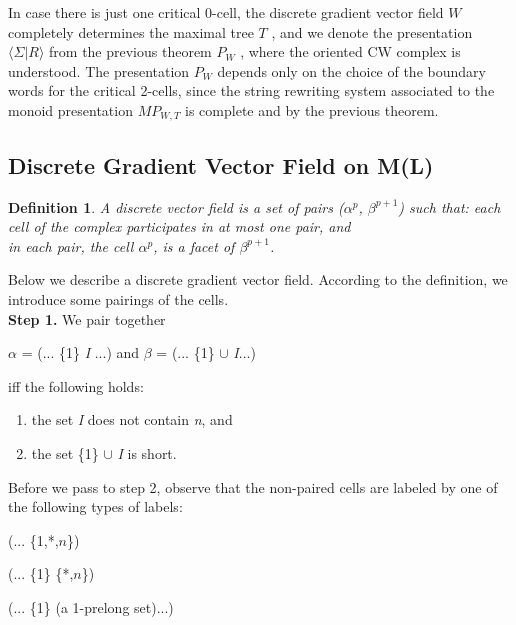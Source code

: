 \documentclass{amsart}
\newtheorem{Definition}[theorem]{Definition}
\newenvironment{definition}{\begin{Definition}\normalfont}{\end{Definition}}
\begin{document}
In case there is just one critical 0-cell, the discrete gradient vector field $W$ completely determines the maximal tree $T$ , and we denote the presentation $\langle \Sigma | R \rangle$ from the previous theorem $P_W$ , where the oriented CW complex is understood. The presentation $P_W$ depends only on the choice of the boundary words for the critical 2-cells, since the string rewriting system associated to the monoid presentation $MP_{W,T}$ is complete and by the previous theorem.


\subsection{Discrete Gradient Vector Field on M(L)}

\begin{definition}\cite{PANZU} A \textit{discrete vector field} is a set of pairs ($\alpha^{p}$, $\beta^{p+1}$)
such that:
each cell of the complex participates in at most one pair, and\\
in each pair, the cell $\alpha^{p}$,  is a facet of $\beta^{p+1}$.
\end{definition}

Below we describe a discrete gradient vector field.
According to the definition, we introduce some pairings of the cells.\\
\textbf{Step 1.} We pair together\\
\begin{center}
{$\alpha$ = (... \{1\} \textit{I} ...) and $\beta$ = (... \{1\} $\cup$ \textit{I}...)}
\end{center}
iff the following holds:\\
\begin{enumerate}
\item the set \textit{I} does not contain \textit{n}, and
\item the set \{1\} $\cup$ \textit{I} is short.
\end{enumerate}

Before we pass to step 2, observe that the non-paired cells are labeled by one of the following types of labels:
\begin{center}
(... \{1,*,$n$\})
\end{center}
\begin{center}
(... \{1\} \{*,$n$\})
\end{center}
\begin{center}
(... \{1\} (a 1-prelong set)...)
\end{center}
\end{document}
